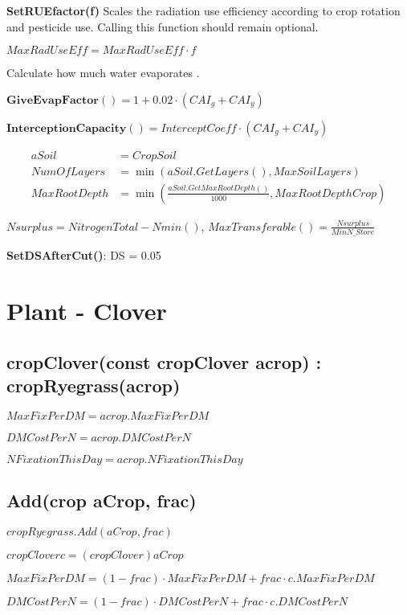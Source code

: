 \documentclass[%
]{scrartcl}
\newcommand\mymarginpar[1]{\marginpar {\flushleft\bfseries\scriptsize #1}}
\begin{document}
\textbf{SetRUEfactor(f)}
Scales the radiation use efficiency according to crop rotation and
pesticide use. Calling this function should remain optional.

$MaxRadUseEff = MaxRadUseEff  \cdot  f$

Calculate how much water evaporates \citep{olesen2000sensitivity}.
   
$\mathbf{GiveEvapFactor()} = 1+0.02  \cdot  (CAI_g+CAI_y) $

$\mathbf{InterceptionCapacity()} = InterceptCoeff  \cdot  (CAI_g+CAI_y)$  \mymarginpar{InterceptCoeff}

  \begin{align*}
   aSoil       & = CropSoil \\
   NumOfLayers & = \min(aSoil.GetLayers(), MaxSoilLayers) \\
	MaxRootDepth & = \min\left(\tfrac{aSoil.GetMaxRootDepth()}{1000},MaxRootDepthCrop\right)
	\end{align*}

$Nsurplus = NitrogenTotal-Nmin()$, $MaxTransferable() = \tfrac{Nsurplus}{MinN\_Store}$   

\textbf{SetDSAfterCut()}: DS = 0.05 


\section{Plant - Clover}


\subsection{cropClover(const cropClover acrop) : cropRyegrass(acrop)}

  $MaxFixPerDM=acrop.MaxFixPerDM$

  $DMCostPerN=acrop.DMCostPerN$

  $NFixationThisDay=acrop.NFixationThisDay$


\subsection{Add(crop aCrop, frac)}

   $cropRyegrass.Add(aCrop,frac)$

   $cropClover c = (cropClover) aCrop$

   $MaxFixPerDM=(1-frac)  \cdot  MaxFixPerDM + frac  \cdot  c.MaxFixPerDM$

   $DMCostPerN=(1-frac)  \cdot  DMCostPerN + frac  \cdot  c.DMCostPerN$
\end{document}

